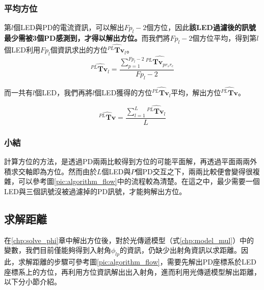     \subsubsection{平均方位}
    \label{chp:orient_average}

        第$l$個LED與PD的電流資訊，可以解出$Fp_l-2$個方位，因此\textbf{該LED過濾後的訊號最少需被3個PD感測到，才得以解出方位。}而我們將$Fp_l-2$個方位平均，得到第$l$個LED利用$Fp_l$個資訊求出的方位$\hat{{^{PL}\boldsymbol{Tv}}_{l}}$。
        \begin{equation}
            \label{eqn:average_orient_led}
            \hat{{^{PL}\boldsymbol{Tv}}_{l}} = \frac{\sum^{Fp_l-2}_{p=1}\hat{{^{PL}\boldsymbol{Tv}}_{p{r_sr_c}}}}{Fp_l-2}
        \end{equation}

        而一共有$l$個LED，我們再將$l$個LED獲得的方位$\hat{{^{PL}\boldsymbol{Tv}}_{l}}$平均，解出方位$\hat{{^{PL}\boldsymbol{Tv}}}$。

        \begin{equation}
            \label{eqn:average_orient}
            \hat{{^{PL}\boldsymbol{Tv}}} = \frac{\sum^{L}_{l=1}\hat{{^{PL}\boldsymbol{Tv}}_{l}}}{L}
        \end{equation}
        
        
    \subsubsection{小結}
    \label{chp:orient_conclu}

    計算方位的方法，是透過PD兩兩比較得到方位的可能平面解，再透過平面兩兩外積求交軸即為方位。然而由於$L$個LED與$P$個PD交互之下，兩兩比較便會變得很複雜，可以參考圖\ref{pic:algorithm_flow}中的流程較為清楚。在這之中，最少需要一個LED與三個訊號沒被過濾掉的PD訊號，才能夠解出方位。

        

         

    


    \subsection{求解距離}
    \label{chp:solve_D}

    在\ref{chp:solve_phi}章中解出方位後，對於光傳遞模型（式\ref{chp:model_mul}）中的變數，我們目前僅能夠得到入射角$\phi_{lp}$的資訊，仍缺少出射角資訊以求距離。因此，求解距離的步驟可參考圖\ref{pic:algorithm_flow}，需要先解出PD座標系於LED座標系上的方位，再利用方位資訊解出出入射角，進而利用光傳遞模型解出距離，以下分小節介紹。

